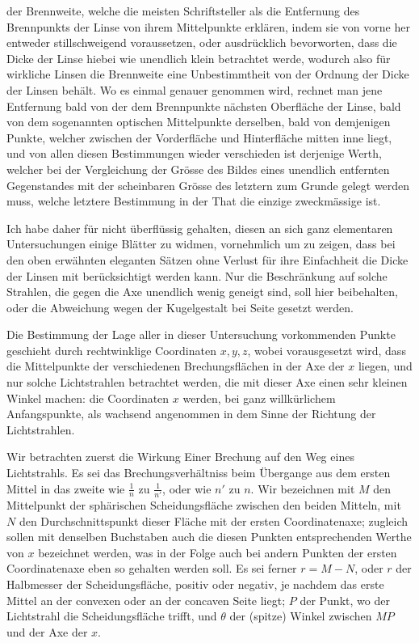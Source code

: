 der Brennweite, welche die meisten Schriftsteller als die Entfernung des Brennpunkts der Linse von ihrem Mittelpunkte erklären, indem sie von vorne her entweder stillschweigend voraussetzen, oder ausdrücklich bevorworten, dass die Dicke der Linse hiebei wie unendlich klein betrachtet werde, wodurch also für wirkliche Linsen die Brennweite eine Unbestimmtheit von der Ordnung der Dicke der Linsen behält. Wo es einmal genauer genommen wird, rechnet man jene Entfernung bald von der dem Brennpunkte nächsten Oberfläche der Linse, bald von dem sogenannten optischen Mittelpunkte derselben, bald von demjenigen Punkte, welcher zwischen der Vorderfläche und Hinterfläche mitten inne liegt, und von allen diesen Bestimmungen wieder verschieden ist derjenige Werth, welcher bei der Vergleichung der Grösse des Bildes eines unendlich entfernten Gegenstandes mit der scheinbaren Grösse des letztern zum Grunde gelegt werden muss, welche letztere Bestimmung in der That die einzige zweckmässige ist.

Ich habe daher für nicht überflüssig gehalten, diesen an sich ganz elementaren Untersuchungen einige Blätter zu widmen, vornehmlich um zu zeigen, dass bei den oben erwähnten eleganten Sätzen ohne Verlust für ihre Einfachheit die Dicke der Linsen mit berücksichtigt werden kann. Nur die Beschränkung auf solche Strahlen, die gegen die Axe unendlich wenig geneigt sind, soll hier beibehalten, oder die Abweichung wegen der Kugelgestalt bei Seite gesetzt werden.

Die Bestimmung der Lage aller in dieser Untersuchung vorkommenden Punkte geschieht durch rechtwinklige Coordinaten $x,y,z$, wobei vorausgesetzt wird, dass die Mittelpunkte der verschiedenen Brechungsflächen in der Axe der $x$ liegen, und nur solche Lichtstrahlen betrachtet werden, die mit dieser Axe einen sehr kleinen Winkel machen: die Coordinaten $x$ werden, bei ganz willkürlichem Anfangspunkte, als wachsend angenommen in dem Sinne der Richtung der Lichtstrahlen.

Wir betrachten zuerst die Wirkung Einer Brechung auf den Weg eines Lichtstrahls. Es sei das Brechungsverhältniss beim Übergange aus dem ersten Mittel in das zweite wie $\frac1n$ zu $\frac1{n'}$, oder wie $n'$ zu $n$. Wir bezeichnen mit $M$ den Mittelpunkt der sphärischen Scheidungsfläche zwischen den beiden Mitteln, mit $N$ den Durchschnittspunkt dieser Fläche mit der ersten Coordinatenaxe; zugleich sollen mit denselben Buchstaben auch die diesen Punkten entsprechenden
Werthe von $x$ bezeichnet werden, was in der Folge auch bei andern Punkten der ersten Coordinatenaxe eben so gehalten werden soll. Es sei ferner $r=M-N$, oder $r$ der Halbmesser der Scheidungsfläche, positiv oder negativ, je nachdem das erste Mittel an der convexen oder an der concaven Seite liegt; $P$ der Punkt, wo der Lichtstrahl die Scheidungsfläche trifft, und $\theta$ der (spitze) Winkel zwischen $MP$ und der Axe der $x$.

